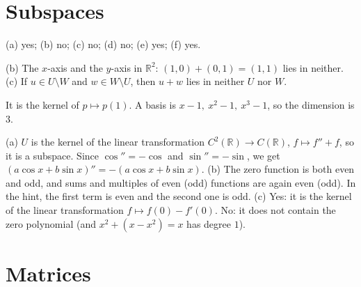 \documentclass[11pt]{article}
\begin{document}
\section*{Subspaces}

\begin{description}[leftmargin=0pt, itemsep=0.3em]
    \item[\ref{pr:subspaces}.] (a) yes; (b) no; (c) no; (d) no; (e) yes; (f) yes.
    \item[\ref{pr:intersection}.] (b) The $x$-axis and the $y$-axis in $\mathbb{R}^2$: $(1, 0) + (0, 1) = (1, 1)$ lies in neither. (c) If $u \in U \setminus W$ and $w \in W \setminus U$, then $u + w$ lies in neither $U$ nor $W$.
    \item[\ref{pr:poly-subspace}.] It is the kernel of $p \mapsto p(1)$. A basis is $x - 1, \ x^2 - 1, \ x^3 - 1$, so the dimension is $3$.
    \item[\ref{pr:fn-subspaces}.] (a) $U$ is the kernel of the linear transformation $C^2(\mathbb{R}) \to C(\mathbb{R})$, $f \mapsto f'' + f$, so it is a subspace. Since $\cos'' = -\cos$ and $\sin'' = -\sin$, we get $(a\cos x + b\sin x)'' = -(a\cos x + b\sin x)$. (b) The zero function is both even and odd, and sums and multiples of even (odd) functions are again even (odd). In the hint, the first term is even and the second one is odd. (c) Yes: it is the kernel of the linear transformation $f \mapsto f(0) - f'(0)$. No: it does not contain the zero polynomial (and $x^2 + (x - x^2) = x$ has degree $1$).
\end{description}

\section*{Matrices}
\end{document}
